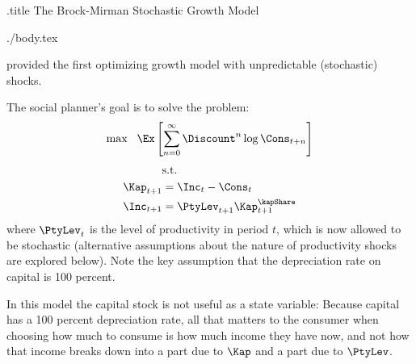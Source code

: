 \documentclass{handout}
\begin{document}
\large
\handoutHeader

\begin{verbatimwrite}{\jobname.title}
The Brock-Mirman Stochastic Growth Model
\end{verbatimwrite}

\handoutNameMake

\begin{verbatimwrite}{./body.tex}

\cite{brockmirman:growth} provided the first optimizing growth model with unpredictable (stochastic) shocks. 

The social planner's goal is to solve the problem:
\begin{equation}
        \max ~~ \Ex\left[ \sum_{n=0}^{\infty} \Discount^{n} \log \Cons_{t+n}\right]
\end{equation}
\begin{equation}\begin{gathered}\begin{aligned}
         & \text{s.t.}  \nonumber
\\      \Kap_{t+1} & =  \Inc_{t}-\Cons_{t} \label{eq:delk}
  \\  \Inc_{t+1}   & =  \PtyLev_{t+1} \Kap_{t+1}^{\kapShare}   
\end{aligned}\end{gathered}\end{equation}
where $\PtyLev_{t}$ is the level of productivity in period $t$, which is now allowed to be stochastic (alternative assumptions about the nature of productivity shocks are explored below).  Note the key assumption
that the depreciation rate on capital is 100 percent.  %

In this model the capital stock is not useful as a state variable: Because capital has a 100 percent depreciation rate, all that matters to the consumer when choosing how much to consume is how much income they have now, and not how that income breaks down into a part due to $\Kap$ and a part due to $\PtyLev$.


\end{verbatimwrite}
\end{document}
